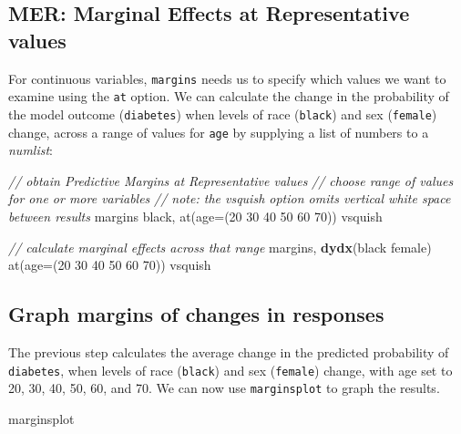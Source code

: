 \documentclass[
]{book}
\newenvironment{Shaded}{\begin{snugshade}}{\end{snugshade}}
\newcommand{\BaseNTok}[1]{\textcolor[rgb]{0.00,0.00,0.81}{#1}}
\newcommand{\CommentTok}[1]{\textcolor[rgb]{0.56,0.35,0.01}{\textit{#1}}}
\newcommand{\FunctionTok}[1]{\textcolor[rgb]{0.00,0.00,0.00}{#1}}
\newcommand{\KeywordTok}[1]{\textcolor[rgb]{0.13,0.29,0.53}{\textbf{#1}}}
\newcommand{\NormalTok}[1]{#1}
\begin{document}
\hypertarget{mer-marginal-effects-at-representative-values}{%
\subsection{MER: Marginal Effects at Representative values}\label{mer-marginal-effects-at-representative-values}}

For continuous variables, \texttt{margins} needs us to specify which values we want to examine using the \texttt{at} option. We can calculate the change in the probability of the model outcome (\texttt{diabetes}) when levels of race (\texttt{black}) and sex (\texttt{female}) change, across a range of values for \texttt{age} by supplying a list of numbers to a \emph{numlist}:

\begin{Shaded}
\begin{Highlighting}[]
\CommentTok{// obtain Predictive Margins at Representative values}
\CommentTok{// choose range of values for one or more variables}
\CommentTok{// note: the \textasciigrave{}vsquish\textasciigrave{} option omits vertical white space between results}
\NormalTok{margins }\BaseNTok{black}\NormalTok{, }\FunctionTok{at}\NormalTok{(age=(20 30 40 50 60 70)) vsquish }

\CommentTok{// calculate marginal effects across that range }
\NormalTok{margins, }\KeywordTok{dydx}\NormalTok{(}\BaseNTok{black}\NormalTok{ female) }\FunctionTok{at}\NormalTok{(age=(20 30 40 50 60 70)) vsquish }
\end{Highlighting}
\end{Shaded}

\hypertarget{graph-margins-of-changes-in-responses}{%
\subsection{Graph margins of changes in responses}\label{graph-margins-of-changes-in-responses}}

The previous step calculates the average change in the predicted probability of \texttt{diabetes}, when levels of race (\texttt{black}) and sex (\texttt{female}) change, with age set to 20, 30, 40, 50, 60, and 70. We can now use \texttt{marginsplot} to graph the results.

\begin{Shaded}
\begin{Highlighting}[]
\NormalTok{marginsplot}
\end{Highlighting}
\end{Shaded}
\end{document}

